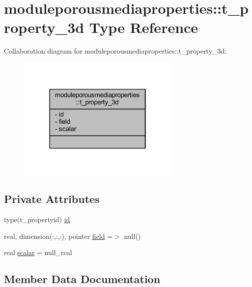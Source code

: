 \hypertarget{structmoduleporousmediaproperties_1_1t__property__3d}{}\section{moduleporousmediaproperties\+:\+:t\+\_\+property\+\_\+3d Type Reference}
\label{structmoduleporousmediaproperties_1_1t__property__3d}


Collaboration diagram for moduleporousmediaproperties\+:\+:t\+\_\+property\+\_\+3d\+:\nopagebreak
\begin{figure}[H]
\begin{center}
\leavevmode
\includegraphics[width=226pt]{structmoduleporousmediaproperties_1_1t__property__3d__coll__graph}
\end{center}
\end{figure}
\subsection*{Private Attributes}
\begin{DoxyCompactItemize}
\item 
type(t\+\_\+propertyid) \mbox{\hyperlink{structmoduleporousmediaproperties_1_1t__property__3d_a4971e8f69509f1d303edfa0626220723}{id}}
\item 
real, dimension(\+:,\+:,\+:), pointer \mbox{\hyperlink{structmoduleporousmediaproperties_1_1t__property__3d_a94de939e4dd9f7e2ad656fc813872cfa}{field}} =$>$ null()
\item 
real \mbox{\hyperlink{structmoduleporousmediaproperties_1_1t__property__3d_af5056850ac986fe1a2035f2aa29eada9}{scalar}} = null\+\_\+real
\end{DoxyCompactItemize}


\subsection{Member Data Documentation}
\mbox{\label{structmoduleporousmediaproperties_1_1t__property__3d_a94de939e4dd9f7e2ad656fc813872cfa}} 
